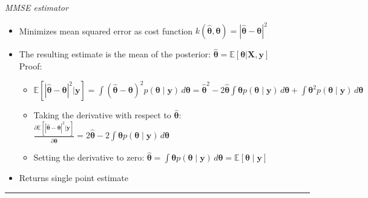 \emph{MMSE estimator}
\begin{itemize}
    \item Minimizes mean squared error as cost function $k(\hat{\boldsymbol{\theta}},\boldsymbol{\theta}) = | \hat{\boldsymbol{\theta}} - \boldsymbol{\theta} |^2$
    \item The resulting estimate is the mean of the posterior: $\hat{\boldsymbol{\theta}} = \mathbb{E}[ \boldsymbol{\theta} | \boldsymbol{X}, \boldsymbol{y} ]$\\
    Proof:
    \begin{itemize}
        \item $
        \mathbb{E}[| \hat{\boldsymbol{\theta}} - \boldsymbol{\theta} |^2 | \boldsymbol{y}] = \int (\hat{\boldsymbol{\theta}} - \boldsymbol{\theta})^2 p(\boldsymbol{\theta} \mid \boldsymbol{y}) \, d\boldsymbol{\theta} = \hat{\boldsymbol{\theta}}^2 - 2 \hat{\boldsymbol{\theta}} \int \boldsymbol{\theta} p(\boldsymbol{\theta} \mid \boldsymbol{y}) \, d\boldsymbol{\theta} + \int \boldsymbol{\theta}^2 p(\boldsymbol{\theta} \mid \boldsymbol{y}) \, d\boldsymbol{\theta}
        $
        \item Taking the derivative with respect to $\hat{\boldsymbol{\theta}}$:
        $
        \frac{\partial \mathbb{E}[| \hat{\boldsymbol{\theta}} - \boldsymbol{\theta} |^2 | \boldsymbol{y}]}{\partial \hat{\boldsymbol{\theta}}} = 2 \hat{\boldsymbol{\theta}} - 2 \int \boldsymbol{\theta} p(\boldsymbol{\theta} \mid \boldsymbol{y}) \, d\boldsymbol{\theta}
        $
        \item Setting the derivative to zero:
        $
        \hat{\boldsymbol{\theta}} = \int \boldsymbol{\theta} p(\boldsymbol{\theta} \mid \boldsymbol{y}) \, d\boldsymbol{\theta} = \mathbb{E}[\boldsymbol{\theta} \mid \boldsymbol{y}]
        $
    \end{itemize}
    \item Returns single point estimate
\end{itemize}

{\color{lightgray}\hrule height 0.001mm}

